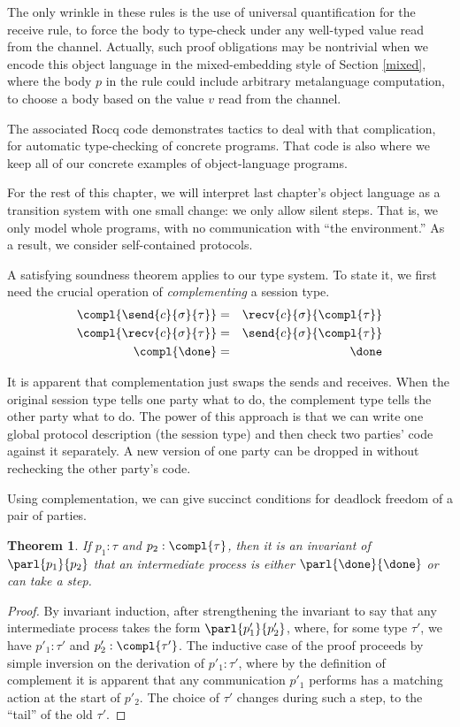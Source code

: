 \documentclass{amsbook}
\newtheorem{theorem}{Theorem}[chapter]
\theoremstyle{definition}
\theoremstyle{remark}
\numberwithin{section}{chapter}
\numberwithin{equation}{chapter}
\begin{document}
The only wrinkle in these rules is the use of universal quantification for the receive rule, to force the body to type-check under any well-typed value read from the channel.
Actually, such proof obligations may be nontrivial when we encode this object language in the mixed-embedding style of Section \ref{mixed}, where the body $p$ in the rule could include arbitrary metalanguage computation, to choose a body based on the value $v$ read from the channel.

The associated Rocq code demonstrates tactics to deal with that complication, for automatic type-checking of concrete programs.
That code is also where we keep all of our concrete examples of object-language programs.

For the rest of this chapter, we will interpret last chapter's object language as a transition system with one small change: we only allow silent steps.
That is, we only model whole programs, with no communication with ``the environment.''
As a result, we consider self-contained protocols.

A satisfying soundness theorem applies to our type system.  To state it, we first need the crucial operation of \emph{complementing} a session type.
\begin{eqnarray*}
  \compl{\send{c}{\sigma}{\tau}} &=& \recv{c}{\sigma}{\compl{\tau}} \\
  \compl{\recv{c}{\sigma}{\tau}} &=& \send{c}{\sigma}{\compl{\tau}} \\
  \compl{\done} &=& \done
\end{eqnarray*}

\modularity
It is apparent that complementation just swaps the sends and receives.
When the original session type tells one party what to do, the complement type tells the other party what to do.
The power of this approach is that we can write one global protocol description (the session type) and then check two parties' code against it separately.
A new version of one party can be dropped in without rechecking the other party's code.

Using complementation, we can give succinct conditions for deadlock freedom of a pair of parties.

\begin{theorem}\label{stsound1}
  If $p_1 : \tau$ and $p_2 : \compl{\tau}$, then it is an invariant of $\parl{p_1}{p_2}$ that an intermediate process is either $\parl{\done}{\done}$ or can take a step.
\end{theorem}
\begin{proof}
  By invariant induction, after strengthening the invariant to say that any intermediate process takes the form $\parl{p'_1}{p'_2}$, where, for some type $\tau'$, we have $p'_1 : \tau'$ and $p'_2 : \compl{\tau'}$.
  The inductive case of the proof proceeds by simple inversion on the derivation of $p'_1 : \tau'$, where by the definition of complement it is apparent that any communication $p'_1$ performs has a matching action at the start of $p'_2$.
  The choice of $\tau'$ changes during such a step, to the ``tail'' of the old $\tau'$.
\end{proof}
\end{document}
